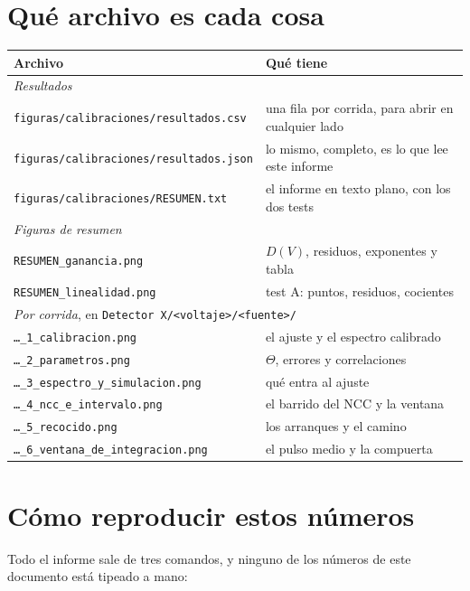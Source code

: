 \documentclass[11pt,a4paper]{article}
\begin{document}
\section{Qué archivo es cada cosa}
\label{ap:archivos}

\begin{center}
\begin{tabular}{ll}
\toprule
\textbf{Archivo} & \textbf{Qué tiene} \\
\midrule
\multicolumn{2}{l}{\textit{Resultados}} \\
\texttt{figuras/calibraciones/resultados.csv} &
   una fila por corrida, para abrir en cualquier lado \\
\texttt{figuras/calibraciones/resultados.json} &
   lo mismo, completo, es lo que lee este informe \\
\texttt{figuras/calibraciones/RESUMEN.txt} &
   el informe en texto plano, con los dos tests \\
\midrule
\multicolumn{2}{l}{\textit{Figuras de resumen}} \\
\texttt{RESUMEN\_ganancia.png} & $D(V)$, residuos, exponentes y tabla \\
\texttt{RESUMEN\_linealidad.png} & test A: puntos, residuos, cocientes \\
\midrule
\multicolumn{2}{l}{\textit{Por corrida}, en
   \texttt{Detector X/<voltaje>/<fuente>/}} \\
\texttt{\ldots\_1\_calibracion.png} & el ajuste y el espectro calibrado \\
\texttt{\ldots\_2\_parametros.png} & $\Theta$, errores y correlaciones \\
\texttt{\ldots\_3\_espectro\_y\_simulacion.png} & qué entra al ajuste \\
\texttt{\ldots\_4\_ncc\_e\_intervalo.png} & el barrido del NCC y la ventana \\
\texttt{\ldots\_5\_recocido.png} & los \NArranques{} arranques y el camino \\
\texttt{\ldots\_6\_ventana\_de\_integracion.png} &
   el pulso medio y la compuerta \\
\bottomrule
\end{tabular}
\end{center}

\section{Cómo reproducir estos números}
\label{ap:reproducir}

Todo el informe sale de tres comandos, y ninguno de los números de este
documento está tipeado a mano:
\end{document}
